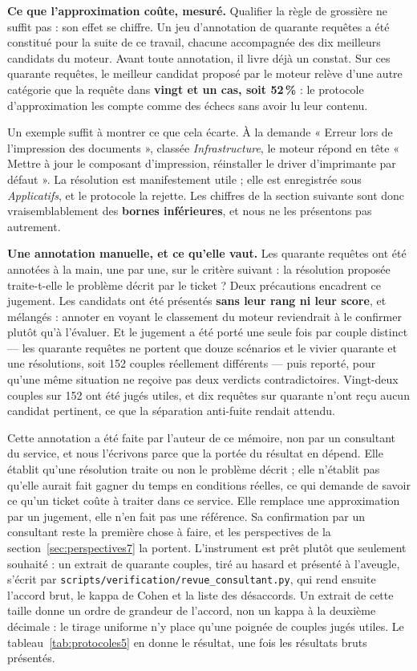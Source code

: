 \textbf{Ce que l'approximation coûte, mesuré.} Qualifier la règle de grossière ne suffit pas : son
effet se chiffre. Un jeu d'annotation de quarante requêtes a été constitué pour la suite de ce
travail, chacune accompagnée des dix meilleurs candidats du moteur. Avant toute annotation, il
livre déjà un constat. Sur ces quarante requêtes, le meilleur candidat proposé par le moteur relève
d'une autre catégorie que la requête dans \textbf{vingt et un cas, soit 52\,\%} : le protocole
d'approximation les compte comme des échecs sans avoir lu leur contenu.

Un exemple suffit à montrer ce que cela écarte. À la demande « Erreur lors de l'impression des
documents », classée \emph{Infrastructure}, le moteur répond en tête « Mettre à jour le composant
d'impression, réinstaller le driver d'imprimante par défaut ». La résolution est manifestement
utile ; elle est enregistrée sous \emph{Applicatifs}, et le protocole la rejette. Les chiffres de
la section suivante sont donc vraisemblablement des \textbf{bornes inférieures}, et nous ne les
présentons pas autrement.

\textbf{Une annotation manuelle, et ce qu'elle vaut.} Les quarante requêtes ont été annotées à la
main, une par une, sur le critère suivant : la résolution proposée traite-t-elle le problème décrit
par le ticket ? Deux précautions encadrent ce jugement. Les candidats ont été présentés
\textbf{sans leur rang ni leur score}, et mélangés : annoter en voyant le classement du moteur
reviendrait à le confirmer plutôt qu'à l'évaluer. Et le jugement a été porté une seule fois par
couple distinct — les quarante requêtes ne portent que douze scénarios et le vivier quarante et une
résolutions, soit 152 couples réellement différents — puis reporté, pour qu'une même situation ne
reçoive pas deux verdicts contradictoires. Vingt-deux couples sur 152 ont été jugés utiles, et dix
requêtes sur quarante n'ont reçu aucun candidat pertinent, ce que la séparation anti-fuite rendait
attendu.

Cette annotation a été faite par l'auteur de ce mémoire, non par un consultant du service, et nous
l'écrivons parce que la portée du résultat en dépend. Elle établit qu'une résolution traite ou non
le problème décrit ; elle n'établit pas qu'elle aurait fait gagner du temps en conditions réelles,
ce qui demande de savoir ce qu'un ticket coûte à traiter dans ce service. Elle remplace une
approximation par un jugement, elle n'en fait pas une référence. Sa confirmation par un consultant
reste la première chose à faire, et les perspectives de la section~\ref{sec:perspectives7} la
portent. L'instrument est prêt plutôt que seulement souhaité : un extrait de quarante couples,
tiré au hasard et présenté à l'aveugle, s'écrit par
\texttt{scripts/verification/revue\_consultant.py}, qui rend ensuite l'accord brut, le kappa de
Cohen et la liste des désaccords. Un extrait de cette taille donne un ordre de grandeur de
l'accord, non un kappa à la deuxième décimale : le tirage uniforme n'y place qu'une poignée de
couples jugés utiles. Le tableau~\ref{tab:protocoles5} en donne le résultat, une fois les
résultats bruts présentés.


